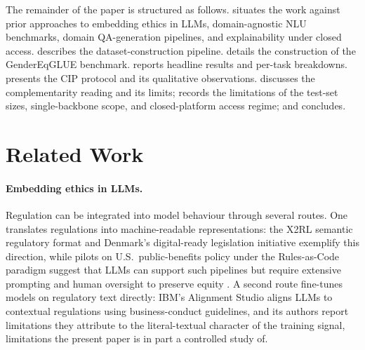 \documentclass[pdflatex, sn-apa]{sn-jnl}%
\theoremstyle{thmstyleone}%
\theoremstyle{thmstyletwo}%
\theoremstyle{thmstylethree}%
\begin{document}
The remainder of the paper is structured as follows. 
situates the work against prior approaches to embedding ethics in LLMs,
domain-agnostic NLU benchmarks, domain QA-generation pipelines, and
explainability under closed access.  describes the
dataset-construction pipeline.  details the construction
of the GenderEqGLUE benchmark.  reports headline results
and per-task breakdowns.  presents the CIP protocol and its
qualitative observations.  discusses the
complementarity reading and its limits;  records the
limitations of the test-set sizes, single-backbone scope, and closed-platform
access regime; and  concludes.

\section{Related Work}
\label{sec:related}

\paragraph{Embedding ethics in LLMs.}
Regulation can be integrated into model behaviour through several routes.
One translates regulations into machine-readable representations: the X2RL
semantic regulatory format \citep{mclaughlin2021x2rl} and Denmark's
digital-ready legislation initiative \citep{motzfeldt2018digital} exemplify
this direction, while pilots on U.S.\ public-benefits policy under the
Rules-as-Code paradigm suggest that LLMs can support such pipelines but
require extensive prompting and human oversight to preserve equity
\citep{naumova2023responsibility}. A second route fine-tunes models on
regulatory text directly: IBM's Alignment Studio
\citep{achintalwar2024alignment} aligns LLMs to contextual regulations using
business-conduct guidelines, and its authors report limitations they
attribute to the literal-textual character of the training signal,
limitations the present paper is in part a controlled study of.
\end{document}
